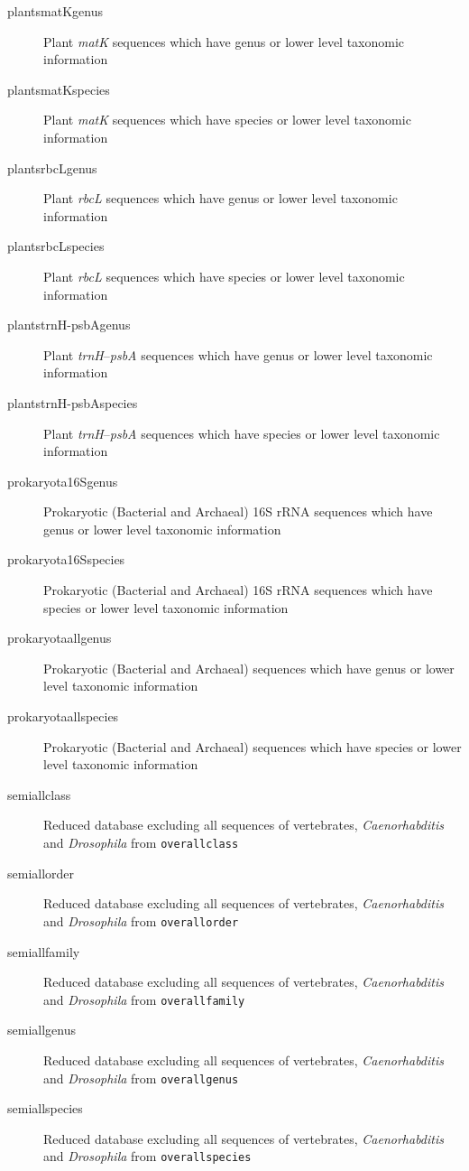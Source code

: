 \documentclass[titlepage,10pt,a4paper,english]{jsbook}
\begin{document}
\begin{description}
\item[plants{\textunderscore}matK{\textunderscore}genus] Plant \textit{matK} sequences which have genus or lower level taxonomic information
\item[plants{\textunderscore}matK{\textunderscore}species] Plant \textit{matK} sequences which have species or lower level taxonomic information
\item[plants{\textunderscore}rbcL{\textunderscore}genus] Plant \textit{rbcL} sequences which have genus or lower level taxonomic information
\item[plants{\textunderscore}rbcL{\textunderscore}species] Plant \textit{rbcL} sequences which have species or lower level taxonomic information
\item[plants{\textunderscore}trnH-psbA{\textunderscore}genus] Plant \textit{trnH}--\textit{psbA} sequences which have genus or lower level taxonomic information
\item[plants{\textunderscore}trnH-psbA{\textunderscore}species] Plant \textit{trnH}--\textit{psbA} sequences which have species or lower level taxonomic information
\item[prokaryota{\textunderscore}16S{\textunderscore}genus] Prokaryotic (Bacterial and Archaeal) 16S rRNA sequences which have genus or lower level taxonomic information
\item[prokaryota{\textunderscore}16S{\textunderscore}species] Prokaryotic (Bacterial and Archaeal) 16S rRNA sequences which have species or lower level taxonomic information
\item[prokaryota{\textunderscore}all{\textunderscore}genus] Prokaryotic (Bacterial and Archaeal) sequences which have genus or lower level taxonomic information
\item[prokaryota{\textunderscore}all{\textunderscore}species] Prokaryotic (Bacterial and Archaeal) sequences which have species or lower level taxonomic information
\item[semiall{\textunderscore}class] Reduced database excluding all sequences of vertebrates, \textit{Caenorhabditis} and \textit{Drosophila} from \texttt{overall{\textunderscore}class}
\item[semiall{\textunderscore}order] Reduced database excluding all sequences of vertebrates, \textit{Caenorhabditis} and \textit{Drosophila} from \texttt{overall{\textunderscore}order}
\item[semiall{\textunderscore}family] Reduced database excluding all sequences of vertebrates, \textit{Caenorhabditis} and \textit{Drosophila} from \texttt{overall{\textunderscore}family}
\item[semiall{\textunderscore}genus] Reduced database excluding all sequences of vertebrates, \textit{Caenorhabditis} and \textit{Drosophila} from \texttt{overall{\textunderscore}genus}
\item[semiall{\textunderscore}species] Reduced database excluding all sequences of vertebrates, \textit{Caenorhabditis} and \textit{Drosophila} from \texttt{overall{\textunderscore}species}
\end{description}
\end{document}
